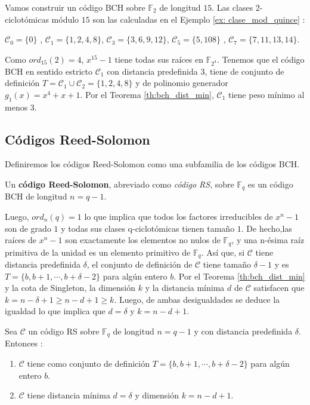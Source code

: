 \begin{exampleth}
\label{ex:construir_BCH}
Vamos construir un código BCH sobre $\mathbb{F}_2$ de longitud $15$. Las clases 2-ciclotómicas módulo $15$ son las calculadas en el Ejemplo \ref{ex: clase_mod_quince} :

$\mathcal{C}_0 = \{ 0 \}$ , $\mathcal{C}_1 = \{ 1,2,4,8 \}$, $\mathcal{C}_3 = \{ 3,6,9,12 \}$, $\mathcal{C}_5 = \{ 5,108 \}$ , $\mathcal{C}_7 = \{ 7,11,13,14 \}$.


Como $ord_{15}(2) = 4$, $x^{15}-1$ tiene todas sus raíces en $\mathbb{F}_{2^4}$.  Tenemos que el código BCH en sentido estricto $\mathcal{C}_1$ con distancia predefinida 3, tiene de conjunto de definición $ T = \mathcal{C}_1 \cup \mathcal{C}_2 = \{ 1,2,4,8 \}$ y de polinomio generador $g_1(x) = x^4 + x + 1$. Por el Teorema \ref{th:bch_dist_min}, $\mathcal{C}_1$ tiene peso mínimo al menos 3.

\end{exampleth}




\subsection{Códigos Reed-Solomon}

Definiremos los códigos Reed-Solomon como una subfamilia de los códigos BCH. 

\begin{definition}

Un \textbf{código Reed-Solomon}, abreviado como \textit{código RS}, sobre $\mathbb{F}_q$ es un código BCH de longitud $n = q-1$. 
\end{definition}

Luego, $ord_n(q) = 1$ lo que implica que todos los factores irreducibles de $x^n-1$ son de grado $1$ y todas sus clases q-ciclotómicas tienen tamaño $1$. De hecho,las raíces de $x^n-1$ son exactamente los elementos no nulos de $\mathbb{F}_q$, y una n-ésima raíz primitiva de la unidad es un elemento primitivo de $\mathbb{F}_q$. Así que, si $\mathcal{C}$ tiene distancia predefinida $\delta$, el conjunto de definición de $\mathcal{C}$ tiene tamaño $\delta-1$ y es $T = \{ b, b+1,\cdots, b+\delta-2 \}$ para algún entero $b$. Por el Teorema \ref{th:bch_dist_min} y la cota de Singleton, la dimensión $k$ y la distancia mínima $d$ de $\mathcal{C}$ satisfacen que $k = n -\delta + 1 \geq n-d+1 \geq k$. Luego, de ambas desigualdades se deduce la igualdad lo que implica que $ d = \delta$ y $k = n-d+1$.


\begin{theorem}
\label{th:crear_RS}
Sea $\mathcal{C}$ un código RS sobre $\mathbb{F}_q$ de longitud $n = q-1$ y con distancia predefinida $\delta$. Entonces :
\begin{enumerate}
	\item $\mathcal{C}$ tiene como conjunto de definición $T = \{ b, b+1,\cdots, b+\delta-2 \}$ para algún entero $b$.
	\item $\mathcal{C}$ tiene distancia mínima $ d = \delta$ y dimensión $k = n-d+1$.
\end{enumerate}
\end{theorem}

